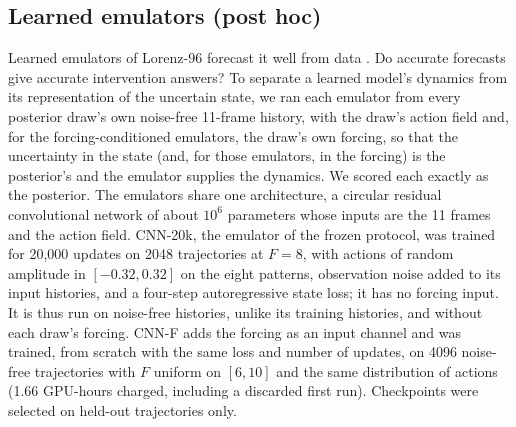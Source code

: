 \documentclass[11pt]{article}
\begin{document}
\subsection{Learned emulators (post hoc)}
\label{sec:emulators}
Learned emulators of Lorenz-96 forecast it well from data \citep{chattopadhyay2020datadriven}. Do accurate forecasts give accurate intervention answers? To separate a learned model's dynamics from its representation of the uncertain state, we ran each emulator from every posterior draw's own noise-free 11-frame history, with the draw's action field and, for the forcing-conditioned emulators, the draw's own forcing, so that the uncertainty in the state (and, for those emulators, in the forcing) is the posterior's and the emulator supplies the dynamics. We scored each exactly as the posterior. The emulators share one architecture, a circular residual convolutional network of about $10^6$ parameters whose inputs are the 11 frames and the action field. CNN-20k, the emulator of the frozen protocol, was trained for 20,000 updates on 2048 trajectories at $F = 8$, with actions of random amplitude in $[-0.32, 0.32]$ on the eight patterns, observation noise added to its input histories, and a four-step autoregressive state loss; it has no forcing input. It is thus run on noise-free histories, unlike its training histories, and without each draw's forcing. CNN-F adds the forcing as an input channel and was trained, from scratch with the same loss and number of updates, on 4096 noise-free trajectories with $F$ uniform on $[6, 10]$ and the same distribution of actions (1.66 GPU-hours charged, including a discarded first run). Checkpoints were selected on held-out trajectories only.
\end{document}
